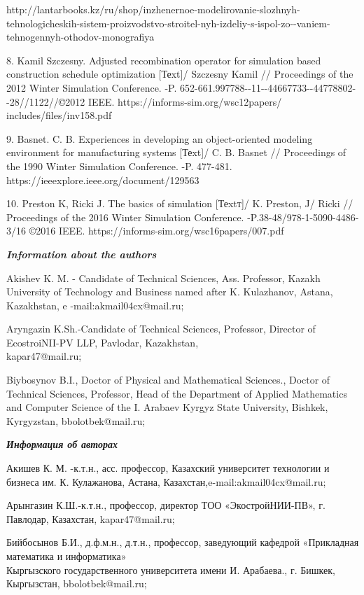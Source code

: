 \begin{noparindent}
http://lantarbooks.kz/ru/shop/inzhenernoe-modelirovanie-slozhnyh-tehnologicheskih-sistem-proizvodstvo-stroitel-nyh-izdeliy-s-ispol-zo-\/-vaniem-tehnogennyh-othodov-monografiya

8. Kamil Szczesny. Adjusted recombination operator for simulation based
construction schedule optimization {[}Теxt{]}/ Szczesny Kamil //
Proceedings of the 2012 Winter Simulation Conference. -P.
652-661.997788-\/-11-\/-44667733-\/-44778802-\/-28//1122//©2012 IEEE.
https://informs-sim.org/wsc12papers/ includes/files/inv158.pdf

9. Basnet. C. B. Experiences in developing an object-oriented modeling
environment for manufacturing systems {[}Теxt{]}/ C. B. Basnet //
Proceedings of the 1990 Winter Simulation Conference. -P. 477-481.
https://ieeexplore.ieee.org/document/129563

10. Preston K, Ricki J. The basics of simulation {[}Теxtт{]}/ K.
Preston, J/ Ricki // Proceedings of the 2016 Winter Simulation
Conference. -P.38-48/978-1-5090-4486-3/16 ©2016 IEEE.
https://informs-sim.org/wsc16papers/007.pdf
\end{noparindent}

\emph{{\bfseries Information about the authors}}
\begin{noparindent}

Akishev K. M. - Candidate of Technical Sciences, Ass. Professor, Kazakh
University of Technology and Business named after K. Kulazhanov, Astana,
Kazakhstan, e -mail:akmail04cx@mail.ru;

Aryngazin K.Sh.-Candidate of Technical Sciences, Professor, Director of
EcostroiNII-PV LLP, Pavlodar, Kazakhstan,\\ kapar47@mail.ru;

Biybosynov B.I., Doctor of Physical and Mathematical Sciences., Doctor
of Technical Sciences, Professor, Head of the Department of Applied
Mathematics and Computer Science of the I. Arabaev Kyrgyz State
University, Bishkek, Kyrgyzstan, bbolotbek@mail.ru;
\end{noparindent}

\emph{{\bfseries Информация об авторах}}
\begin{noparindent}

Акишев К. М. -к.т.н., асс. профессор, Казахский университет технологии и
бизнеса им. К. Кулажанова, Астана, Казахстан,e-mail:akmail04cx@mail.ru;

Арынгазин К.Ш.-к.т.н., профессор, директор ТОО «ЭкостройНИИ-ПВ», г.
Павлодар, Казахстан, kapar47@mail.ru;

Бийбосынов Б.И., д.ф.м.н., д.т.н., профессор, заведующий кафедрой
«Прикладная математика и информатика»\\ Кыргызского государственного
университета имени И. Арабаева., г. Бишкек, Кыргызстан,
bbolotbek@mail.ru;
\end{noparindent}
